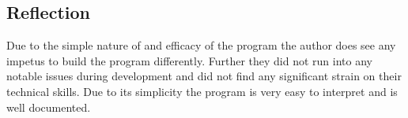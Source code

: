 \documentclass[11pt]{article}
\begin{document}
\subsection{Reflection}
Due to the simple nature of and efficacy of the program the author does see any impetus to build the program differently. Further they did not run into any notable issues during development and did not find any significant strain on their technical skills. Due to its simplicity the program is very easy to interpret and is well documented.


\end{document}
